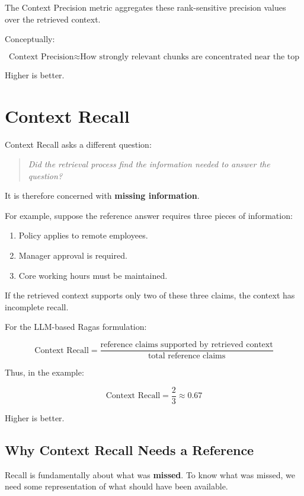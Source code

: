 \documentclass[12pt, a4paper]{article}
\begin{document}
The Context Precision metric aggregates these rank-sensitive precision values over the retrieved context.

Conceptually:

\[
\boxed{
\text{Context Precision}
\approx
\text{How strongly relevant chunks are concentrated near the top}
}
\]

Higher is better.

\section{Context Recall}

Context Recall asks a different question:

\begin{quote}
\textit{Did the retrieval process find the information needed to answer the question?}
\end{quote}

It is therefore concerned with \textbf{missing information}.

For example, suppose the reference answer requires three pieces of information:

\begin{enumerate}
    \item Policy applies to remote employees.
    \item Manager approval is required.
    \item Core working hours must be maintained.
\end{enumerate}

If the retrieved context supports only two of these three claims, the context has incomplete recall.

For the LLM-based Ragas formulation:

\[
\boxed{
\text{Context Recall}
=
\frac{\text{reference claims supported by retrieved context}}
{\text{total reference claims}}
}
\]

Thus, in the example:

\[
\text{Context Recall}
=
\frac{2}{3}
\approx 0.67
\]

Higher is better.

\subsection{Why Context Recall Needs a Reference}

Recall is fundamentally about what was \textbf{missed}. To know what was missed, we need some representation of what should have been available.
\end{document}
